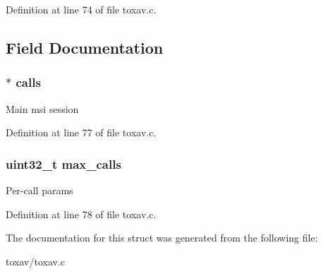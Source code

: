 Definition at line 74 of file toxav.\+c.



\subsection{Field Documentation}
\hypertarget{struct___tox_av_abe854f89ac28ebd5112d1639d531b128}{
\subsubsection[{calls}]{$\ast$ calls}}\label{struct___tox_av_abe854f89ac28ebd5112d1639d531b128}
Main msi session 

Definition at line 77 of file toxav.\+c.

\hypertarget{struct___tox_av_a7d6cf32eb812384ebd4074c588c17499}{
\subsubsection[{max\+\_\+calls}]{\setlength{\rightskip}{0pt plus 5cm}uint32\+\_\+t max\+\_\+calls}}\label{struct___tox_av_a7d6cf32eb812384ebd4074c588c17499}
Per-\/call params 

Definition at line 78 of file toxav.\+c.



The documentation for this struct was generated from the following file\+:\begin{DoxyCompactItemize}
\item 
toxav/toxav.\+c\end{DoxyCompactItemize}
